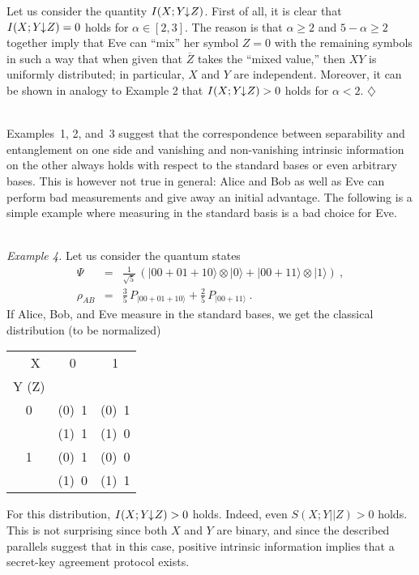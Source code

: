 \documentclass{article}
\newcommand{\exend}{\hspace*{\fill} $\diamondsuit$}
\newcommand{\noi}{\noindent}
\newcommand{\al}{\alpha}
\newcommand{\OZ}{\overline{Z}}
\newcommand{\ida}{I(X;Y\hspace{-1.3mm}\downarrow\hspace{-0.8mm} Z)}
\begin{document}
Let us consider the quantity $\ida$. First of all, it is clear that 
$\ida=0$ holds for $\al\in[2,3]$. The reason is that 
$
\al\geq 2$ and $5-\al\geq 2
$
together imply that Eve can ``mix'' her symbol $Z=0$ with the remaining 
symbols  in such a way that when given that $\OZ$ takes the ``mixed value,'' then
$XY$ is uniformly distributed; in particular, $X$ and $Y$ are 
independent. Moreover, it can be shown in analogy to 
Example 2 that $\ida>0$ holds for  $\al<2$.
\exend
\\ \



Examples~1, 2, and~3 suggest that the correspondence between separability
and entanglement on one side and vanishing and non-vanishing intrinsic 
information on the other always holds with respect to the standard bases
or even arbitrary bases.
This is however not true in general: 
Alice and Bob as well as Eve can perform bad measurements 
and give away an initial advantage. 
The following is   a simple example where 
measuring in the standard basis is a bad choice for Eve.
\\ \

\noi
{\it Example 4.}
Let us consider the quantum states
\begin{eqnarray*}
\Psi &  = &  \frac{1}{\sqrt{5}}\, (|00+01+10\rangle \otimes|0\rangle  + |00+11\rangle \otimes|1\rangle )\ ,\\
\rho_{AB}&  =&  \frac{3}{5}\,  P_{|00+01+10\rangle } + \frac{2}{5}\,  P_{|00+11\rangle }\ .
\end{eqnarray*}
If Alice, Bob, and Eve measure in the standard bases, we get the classical distribution 
 (to be normalized)
\begin{center}
\begin{tabular}{|c||c|c|}
\hline
\ \ X & 0 & 1\\
Y (Z) &&\\
\hline\hline
0 & (0)\ 1 & (0)\ 1 \\
 &  (1)\ 1 & (1)\ 0 \\
\hline
1 & (0)\ 1 & (0)\ 0 \\
  & (1)\ 0 & (1)\ 1\\
\hline
\end{tabular}
\end{center}
For this distribution, $\ida>0$ holds. Indeed, 
even $S(X;Y||Z)>0$ holds.
This is not surprising since both $X$ and $Y$ 
are binary, and since the described parallels suggest that in this 
case, positive intrinsic information implies that a secret-key 
agreement protocol exists. 
\end{document}
